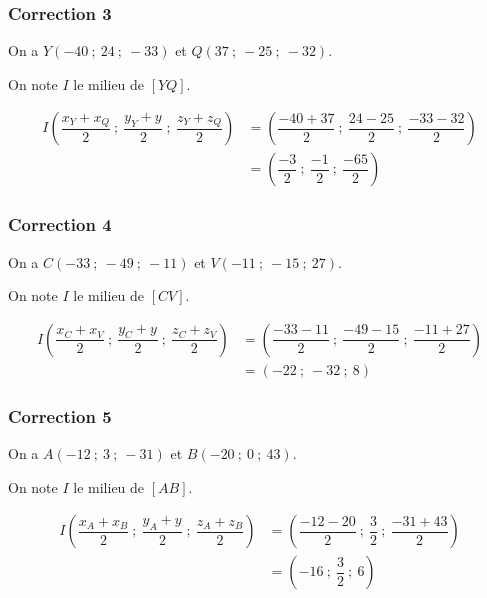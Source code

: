 \documentclass[15pt, mathserif]{beamer}
\begin{document}
\begin{frame}
\vspace{-10mm}
	\frametitle{Correction 3}
On a $Y(-40~;~24~;~-33)$ et $Q(37~;~-25~;~-32)$.

\medskip

On note $I$ le milieu de $[YQ]$.

\begin{align*}
	I\left(\dfrac{x_{Y}+x_{Q}}{2}~;~\dfrac{y_{Y}+y_{}}{2}~;~\dfrac{z_{Y}+z_{Q}}{2}\right)&= \left(\dfrac{-40+37}{2}~;~\dfrac{24-25}{2}~;~\dfrac{-33-32}{2}\right) \\
	&=\left(\dfrac{-3}{2}~;~\dfrac{-1}{2}~;~\dfrac{-65}{2}\right)
\end{align*}\end{frame}


\begin{frame}
\vspace{-10mm}
	\frametitle{Correction 4}
On a $C(-33~;~-49~;~-11)$ et $V(-11~;~-15~;~27)$.

\medskip

On note $I$ le milieu de $[CV]$.

\begin{align*}
	I\left(\dfrac{x_{C}+x_{V}}{2}~;~\dfrac{y_{C}+y_{}}{2}~;~\dfrac{z_{C}+z_{V}}{2}\right)&= \left(\dfrac{-33-11}{2}~;~\dfrac{-49-15}{2}~;~\dfrac{-11+27}{2}\right) \\
	&=\left(-22~;~-32~;~8\right)
\end{align*}\end{frame}


\begin{frame}
\vspace{-10mm}
	\frametitle{Correction 5}
On a $A(-12~;~3~;~-31)$ et $B(-20~;~0~;~43)$.

\medskip

On note $I$ le milieu de $[AB]$.

\begin{align*}
	I\left(\dfrac{x_{A}+x_{B}}{2}~;~\dfrac{y_{A}+y_{}}{2}~;~\dfrac{z_{A}+z_{B}}{2}\right)&= \left(\dfrac{-12-20}{2}~;~\dfrac{3}{2}~;~\dfrac{-31+43}{2}\right) \\
	&=\left(-16~;~\dfrac{3}{2}~;~6\right)
\end{align*}\end{frame}
\end{document}
